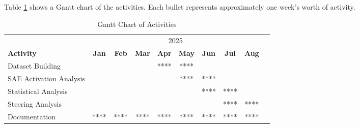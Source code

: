 Table \ref{tab:timetableactivities} shows a Gantt chart of the activities. Each bullet represents approximately one week's worth of activity.

\begin{table}[h]
    \centering
    \begin{tabular}{l|c|c|c|c|c|c|c|c|c}
         \toprule
         &  \multicolumn{8}{c}{2025} \\
         \textbf{Activity} & \textbf{Jan} & \textbf{Feb} & \textbf{Mar} & \textbf{Apr} & \textbf{May} & \textbf{Jun} & \textbf{Jul} & \textbf{Aug}  \\
         \midrule
         Dataset Building & & & & **** & **** & & &  \\
         \midrule
         SAE Activation Analysis & & & & & **** & **** & &  \\
         \midrule
         Statistical Analysis & & & & & & **** & **** &  \\
         \midrule
         Steering Analysis & & & & & & & **** & **** \\
         \midrule
         Documentation & **** & **** & **** & **** & **** & **** & **** & **** \\
         \bottomrule
    \end{tabular}
    \caption{Gantt Chart of Activities}
    \label{tab:timetableactivities}
\end{table}